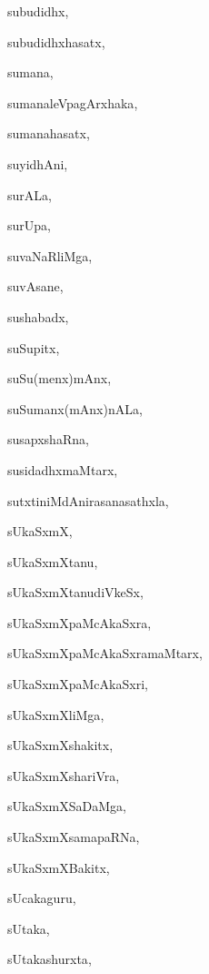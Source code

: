 \begin{multicols}{2}
{subudidhx}, \pageref{subudidhx}

{subudidhxhasatx}, \pageref{subudidhxhasatx}

{sumana}, \pageref{sumana}

{sumanaleVpagArxhaka}, \pageref{sumanaleVpagArxhaka}

{sumanahasatx}, \pageref{sumanahasatx}

{suyidhAni}, \pageref{suyidhAni}

{surALa}, \pageref{surALa}

{surUpa}, \pageref{surUpa}

{suvaNaRliMga}, \pageref{suvaNaRliMga}

{suvAsane}, \pageref{suvAsane}

{sushabadx}, \pageref{sushabadx}

{suSupitx}, \pageref{suSupitx}

{suSu(menx)mAnx}, \pageref{suSumenxmAnx}

{suSumanx(mAnx)nALa}, \pageref{suSumanxmAnxnALa}

{susapxshaRna}, \pageref{susapxshaRna}

{susidadhxmaMtarx}, \pageref{susidadhxmaMtarx}

{sutxtiniMdAnirasanasathxla}, \pageref{sutxtiniMdAnirasanasathxla}

{sUkaSxmX}, \pageref{sUkaSxmX}

{sUkaSxmXtanu}, \pageref{sUkaSxmXtanu}

{sUkaSxmXtanudiVkeSx}, \pageref{sUkaSxmXtanudiVkeSx}

{sUkaSxmXpaMcAkaSxra}, \pageref{sUkaSxmXpaMcAkaSxra}

{sUkaSxmXpaMcAkaSxramaMtarx}, \pageref{sUkaSxmXpaMcAkaSxramaMtarx}

{sUkaSxmXpaMcAkaSxri}, \pageref{sUkaSxmXpaMcAkaSxri}

{sUkaSxmXliMga}, \pageref{sUkaSxmXliMga}

{sUkaSxmXshakitx}, \pageref{sUkaSxmXshakitx}

{sUkaSxmXshariVra}, \pageref{sUkaSxmXshariVra}

{sUkaSxmXSaDaMga}, \pageref{sUkaSxmXSaDaMga}

{sUkaSxmXsamapaRNa}, \pageref{sUkaSxmXsamapaRNa}

{sUkaSxmXBakitx}, \pageref{sUkaSxmXBakitx}

{sUcakaguru}, \pageref{sUcakaguru}

{sUtaka}, \pageref{sUtaka}

{sUtakashurxta}, \pageref{sUtakashurxta}


\end{multicols}
